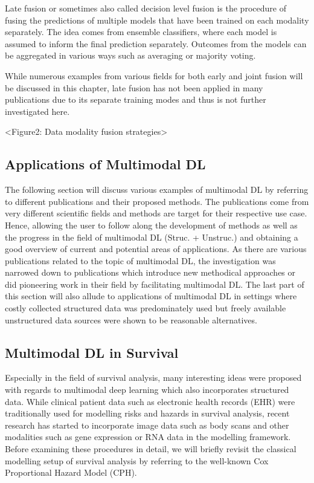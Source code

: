 \documentclass[
]{krantz}
\begin{document}
Late fusion or sometimes also called decision level fusion is the procedure of fusing the predictions of multiple models that have been trained on each modality separately. The idea comes from ensemble classifiers, where each model is assumed to inform the final prediction separately. Outcomes from the models can be aggregated in various ways such as averaging or majority voting.

While numerous examples from various fields for both early and joint fusion will be discussed in this chapter, late fusion has not been applied in many publications due to its separate training modes and thus is not further investigated here.

\textless Figure2: Data modality fusion strategies\textgreater{}

\hypertarget{applications-of-multimodal-dl}{%
\subsection{Applications of Multimodal DL}\label{applications-of-multimodal-dl}}

The following section will discuss various examples of multimodal DL by referring to different publications and their proposed methods. The publications come from very different scientific fields and methods are target for their respective use case. Hence, allowing the user to follow along the development of methods as well as the progress in the field of multimodal DL (Struc. + Unstruc.) and obtaining a good overview of current and potential areas of applications. As there are various publications related to the topic of multimodal DL, the investigation was narrowed down to publications which introduce new methodical approaches or did pioneering work in their field by facilitating multimodal DL.
The last part of this section will also allude to applications of multimodal DL in settings where costly collected structured data was predominately used but freely available unstructured data sources were shown to be reasonable alternatives.

\hypertarget{multimodal-dl-in-survival}{%
\subsection{Multimodal DL in Survival}\label{multimodal-dl-in-survival}}

Especially in the field of survival analysis, many interesting ideas were proposed with regards to multimodal deep learning which also incorporates structured data. While clinical patient data such as electronic health records (EHR) were traditionally used for modelling risks and hazards in survival analysis, recent research has started to incorporate image data such as body scans and other modalities such as gene expression or RNA data in the modelling framework. Before examining these procedures in detail, we will briefly revisit the classical modelling setup of survival analysis by referring to the well-known Cox Proportional Hazard Model (CPH).
\end{document}
